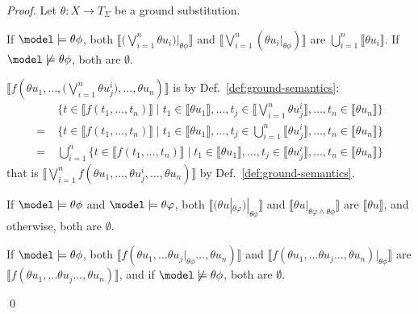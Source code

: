 \geq*
\begin{proof}
Let $\theta : X \to T_\Sigma$ be a ground substitution. 
\begin{inparaenum}[(1)]
	 \item %
	 If $\model \models \theta\phi$, 
	 both $\llbracket \big(\bigvee_{i=1}^n \theta u_i \big) |_{\theta\phi} \rrbracket$ and $\llbracket \bigvee_{i=1}^n (\theta u_i  |_{\theta\phi}) \rrbracket$
	 are $\bigcup_{i=1}^n  \llbracket\theta u_i \rrbracket$.
	 If $\model \not\models \theta\phi$, both are $\emptyset$.
	\item  %
	$\llbracket f(\theta u_1,\ldots, \big(\bigvee_{i=1}^n \theta u_j^i\big), \ldots,\theta u_n) \rrbracket$
	is by Def.~\ref{def:ground-semantics}:
	\[
	\begin{aligned}
	&\textstyle
	\{t \in \llbracket f(t_1,\ldots,t_n)\rrbracket \mid  t_1 \in \llbracket \theta u_1\rrbracket, \ldots, t_j \in \llbracket \bigvee_{i=1}^n \theta u_j^i\rrbracket, \ldots, t_n \in \llbracket \theta u_n\rrbracket \}
	\\
	=\;&\textstyle
	\{t \in \llbracket f(t_1,\ldots,t_n)\rrbracket \mid  t_1 \in \llbracket \theta u_1\rrbracket, \ldots, t_j \in \bigcup_{i=1}^n  \llbracket \theta u_j^i\rrbracket, \ldots, t_n \in \llbracket \theta u_n\rrbracket \}
	\\
	=\;&\textstyle
	\bigcup_{i=1}^n  \{t \in \llbracket f(t_1,\ldots,t_n)\rrbracket \mid  t_1 \in \llbracket \theta u_1\rrbracket, \ldots, t_j \in  \llbracket \theta u_j^i\rrbracket, \ldots, t_n \in \llbracket \theta u_n\rrbracket \}
	\end{aligned}
	\]
	that is $\llbracket \bigvee_{i=1}^n f(\theta u_1,\ldots, \theta u_j^i, \ldots,\theta u_n) \rrbracket$
	by Def.~\ref{def:ground-semantics}.
	\item %
	If $\model \models \theta\phi$ and $\model \models \theta\varphi$,
	 both $\llbracket \big(\theta u |_{\theta\varphi}\big) |_{\theta\phi}\rrbracket$ and $\llbracket \theta u |_{\theta\varphi \wedge \theta\phi} \rrbracket$
	 are $\llbracket \theta u \rrbracket$,
	 and otherwise, both are $\emptyset$. 
	 \item
	 If $\model \models \theta\phi$,
	 both $\llbracket f(\theta u_1,\ldots \theta u_j |_{\theta\phi} \ldots,\theta u_n)\rrbracket $
	 and $\llbracket f(\theta u_1,\ldots \theta u_j \ldots,\theta u_n) |_{\theta\phi} \rrbracket$
	 are  $\llbracket f(\theta u_1,\ldots \theta u_j \ldots,\theta u_n) \rrbracket$,
	 and if $\model \not\models \theta\phi$, both are $\emptyset$.
\end{inparaenum}
\qed
\end{proof}


